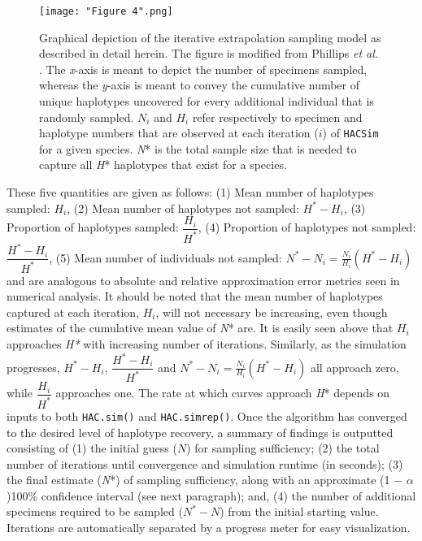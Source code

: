 \begin{figure}[H]

\centering

\texttt{[image: "Figure 4".png]}

\caption{Graphical depiction of the iterative extrapolation sampling model as described in detail herein. The figure is modified from Phillips \textit{et al.} \cite{phillips2019incomplete}. The \textit{x}-axis is meant to depict the number of specimens sampled, whereas the \textit{y}-axis is meant to convey the cumulative number of unique haplotypes uncovered for every additional individual that is randomly sampled. $N_i$ and $H_i$ refer respectively to specimen and haplotype numbers that are observed at each iteration ($i$) of {\tt HACSim} for a given species. \textit{N}* is the total sample size that is needed to capture all \textit{H}* haplotypes that exist for a species.}

\end{figure}


\noindent These five quantities are given as follows: (1) Mean number of haplotypes sampled: $H_i$, (2) Mean number of haplotypes not sampled: $H^*-H_i$, (3) Proportion of haplotypes sampled: $\dfrac{H_i}{H^*}$, (4) Proportion of haplotypes not sampled: $\dfrac{H^*-H_i}{H^*}$, (5) Mean number of individuals not sampled: $N^*-N_i = \frac{N_i}{H_i}\left(H^* - H_i\right)$ and are analogous to absolute and relative approximation error metrics seen in numerical analysis. It should be noted that the mean number of haplotypes captured at each iteration, $H_i$, will not necessary be increasing, even though estimates of the cumulative mean value of \textit{N}* are. It is easily seen above that $H_i$ approaches \textit{H*} with increasing number of iterations. Similarly, as the simulation progresses, $H^*-H_i$, $\dfrac{H^*-H_i}{H^*}$ and $N^*-N_i = \frac{N_i}{H_i}\left(H^* - H_i\right)$ all approach zero, while $\dfrac{H_i}{H^*}$ approaches one. The rate at which curves approach  \textit{H}* depends on inputs to both {\tt HAC.sim()} and {\tt HAC.simrep()}. Once the algorithm has converged to the desired level of haplotype recovery, a summary of findings is outputted consisting of (1) the initial guess ($N$) for sampling sufficiency; (2) the total number of iterations until convergence and simulation runtime (in seconds); (3) the final estimate (\textit{N}*) of sampling sufficiency, along with an approximate (1 $-$ $\alpha$)100\% confidence interval (see next paragraph); and, (4) the number of additional specimens required to be sampled ($N^* - N$) from the initial starting value. \noindent Iterations are automatically separated by a progress meter for easy visualization.

